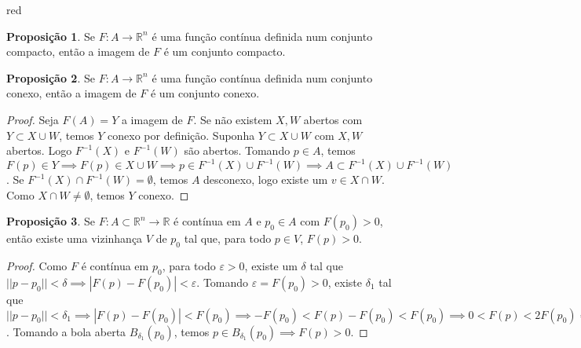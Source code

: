 \documentclass[12pt,leqno,twoside]{amsart}
\theoremstyle{definition}
\newtheorem{proposicao}{Proposição}[section]
\begin{document}
\begin{color}{red}
\vspace{0.3cm}

\begin{proposicao}
	\label{prop:compset}
	Se $F:A\to \mathbb{R}^n$ é uma função contínua definida num conjunto compacto, então a imagem de $F$ é um conjunto compacto.
\end{proposicao}

\vspace{0.3cm}

\begin{proposicao}
	\label{prop:conexset1}
	Se $F:A\to \mathbb{R}^n$ é uma função contínua definida num conjunto conexo, então a imagem de $F$ é um conjunto conexo.
\end{proposicao}
\begin{proof}
	Seja $F(A) = Y$ a imagem de $F$. Se não existem $X,W$ abertos com $Y \subset X\cup W$, temos $Y$ conexo por definição. Suponha $Y \subset X\cup W$ com $X,W$ abertos. Logo $F^{-1}(X)$ e $F^{-1}(W)$ são abertos. Tomando $p\in A$, temos $F(p) \in Y \implies F(p) \in X \cup W \implies p \in F^{-1} (X) \cup F^{-1}(W) \implies A \subset  F^{-1} (X) \cup   F^{-1}(W) $. Se $F^{-1}(X) \cap  F^{-1}(W)  = \emptyset$, temos $A$ desconexo, logo existe um $v \in X\cap W$. Como $X\cap W \neq \emptyset$, temos $Y$ conexo.
\end{proof}

\vspace{0.3cm}

\begin{proposicao}
	Se $F:A\subset \mathbb{R}^n \to \mathbb{R}$ é contínua em $A$ e $p_0\in A$ com $F(p_0) > 0$, então existe uma vizinhança $V$ de $p_0$ tal que, para todo $p\in V$, $F(p)>0$.
\end{proposicao}
\begin{proof}
	Como $F$ é contínua em $p_0$, para todo $\varepsilon>0$, existe um $\delta$ tal que $|| p -p_0||<\delta \implies | F(p) - F(p_0) | < \varepsilon$. Tomando $\varepsilon = F(p_0) > 0$, existe $\delta_1$ tal que $ || p -p_0|| < \delta_1 \implies |F(p) - F(p_0)| < F(p_0) \implies -F(p_0) < F(p) - F(p_0) < F(p_0) \implies 0 < F(p) < 2F(p_0) \implies F(p) > 0 $. Tomando a bola aberta $B_{\delta_1}(p_0)$, temos $p \in B_{\delta_1} (p_0) \implies F(p) > 0 $.
\end{proof}

\vspace{0.3cm}


\end{color}
\end{document}
